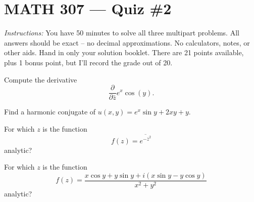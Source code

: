 \documentclass[12pt, answers]{exam}
\begin{document}
\section*{MATH 307 --- Quiz \#2 }

\emph{Instructions:} You have 50 minutes to solve all three multipart problems.
All answers should be exact -- no decimal approximations.
No calculators, notes, or other aids.
Hand in only your solution booklet. 
There are 21 points available, plus 1 bonus point, but I'll record the grade out of 20.

\begin{questions}
    \setlength\itemsep{1.25em}
    \setlength\parskip{1em}

    \question
    Compute the derivative
    \[
    \frac{\partial}{\partial \bar z}{e^x\cos(y)}.
    \]

    \question
    Find a harmonic conjugate of $u(x,y) = e^x\sin y + 2xy + y$.

    \question
    For which $z$ is the function
    \[
        f(z) = \overline{e^{-{\bar z}^2}}
    \]
    analytic?

    \question
    For which $z$ is the function
    \[
        f(z) = \frac{x\cos y + y\sin y + i(x\sin y - y\cos y)}{x^2+y^2}
    \]
    analytic?
\end{questions}
\end{document}
